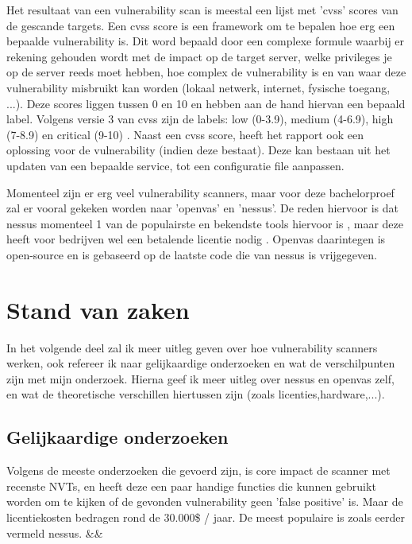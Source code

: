 Het resultaat van een vulnerability scan is meestal een lijst met 'cvss' scores van de gescande targets. Een cvss score is een framework om te bepalen hoe erg een bepaalde vulnerability is. Dit word bepaald door een complexe formule waarbij er rekening gehouden wordt met de impact op de target server, welke privileges je op de server reeds moet hebben, hoe complex de vulnerability is en van waar deze vulnerability misbruikt kan worden (lokaal netwerk, internet, fysische toegang, ...). Deze scores liggen tussen 0 en 10 en hebben aan de hand hiervan een bepaald label. Volgens versie 3 van cvss zijn de labels: low (0-3.9), medium (4-6.9), high (7-8.9) en critical (9-10) \textcite{Nist}. Naast een cvss score, heeft het rapport ook een oplossing voor de vulnerability (indien deze bestaat). Deze kan bestaan uit het updaten van een bepaalde service, tot een configuratie file aanpassen.

Momenteel zijn er erg veel vulnerability scanners, maar voor deze bachelorproef zal er vooral gekeken worden naar 'openvas' en 'nessus'. De reden hiervoor is dat nessus momenteel 1 van de populairste en bekendste tools hiervoor is \textcite{Sectools}, maar deze heeft voor bedrijven wel een betalende licentie nodig \textcite{Tenable}. Openvas daarintegen is open-source en is gebaseerd op de laatste code die van nessus is vrijgegeven. 

\section{Stand van zaken}
\label{sec:stand-van-zaken}

In het volgende deel zal ik meer uitleg geven over hoe vulnerability scanners werken, ook refereer ik naar gelijkaardige onderzoeken en wat de verschilpunten zijn met mijn onderzoek. Hierna geef ik meer uitleg over nessus en openvas zelf, en wat de theoretische verschillen hiertussen zijn (zoals licenties,hardware,...). 

\subsection{Gelijkaardige onderzoeken}

Volgens de meeste onderzoeken die gevoerd zijn, is core impact de scanner met recenste NVTs, en heeft deze een paar handige functies die kunnen gebruikt worden om te kijken of de gevonden vulnerability geen 'false positive' is. Maar de licentiekosten bedragen rond de 30.000\$ / jaar. De meest populaire is zoals eerder vermeld nessus. \textcite{Concise} \&\& \textcite{Sectools} 

